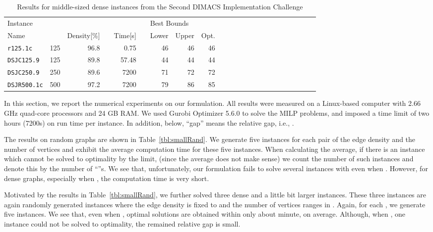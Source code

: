 \documentclass[11pt,a4paper]{article}
\begin{document}
\begin{table}[tb]
\caption{Results for middle-sized dense instances from the Second DIMACS Implementation Challenge \label{tbl:middleDMCS}}
\begin{center}
{\small
\begin{tabular}{lrrrrrrrrrrrrrrrrrrrrrr}
\toprule
\multicolumn{3}{l}{Instance}	&&		&&\multicolumn{2}{l}{Best Bounds}		\\	\cline{1-3} \cline{7-8}
\multicolumn{1}{l}{Name}	&\multicolumn{1}{c}{}	&\multicolumn{1}{l}{Density[\%]}
&&\multicolumn{1}{l}{Time[s]}
&&Lower	&Upper	& Opt. \\
\midrule	
\texttt{r125.1c}		&	125	&96.8	&&	0.75		&&	46	&	46 	& 46 \\	
\texttt{DSJC125.9}	&	125	&89.8	&&	57.48		&&	44	&	44 	& 44 \cite{GuMa}\\	
\texttt{DSJC250.9}	&	250	&89.6	&&	7200		&&	71 	&	72 	& 72 \cite{HeCoSe}\\	
\texttt{DSJR500.1c}	&	500	&97.2	&&	7200		&&	79	&	86 	& 85 \cite{GuMa}\\
\bottomrule
\end{tabular}
}
\end{center}
\end{table}


In this section, we report the numerical experiments on our formulation. 
All results were measured on a Linux-based computer with 2.66 GHz quad-core processors and 24 GB RAM. 
We used Gurobi Optimizer 5.6.0 to solve the MILP problems, 
and imposed a time limit of two hours (7200s) on run time per instance. 
In addition, below, ``gap'' means the relative gap, i.e., . 

\par 

The results on random graphs are shown in Table~\ref{tbl:smallRand}. 
We generate five instances for each pair of 
the edge density  and the number of vertices  
and exhibit the average computation time for these five instances.  
When calculating the average, 
if there is an instance which cannot be solved to optimality by the limit, 
(since the average does not make sense) 
we count the number of such instances and denote this by the number of ``''s. 
We see that, unfortunately, our formulation fails to solve several instances with  even when . 
However, for dense graphs, especially when , the computation time is very short. 

\par

Motivated by the results in Table~\ref{tbl:smallRand}, 
we further solved three dense and a little bit larger instances. 
These three instances are again randomly generated instances 
where the edge density  is fixed to  and the number of vertices  ranges in . 
Again, for each , we generate five instances. 
We see that, even when , optimal solutions are obtained within only about  minute, on average. 
Although, when , one instance could not be solved to optimality, the remained relative gap is small. 
\end{document}
